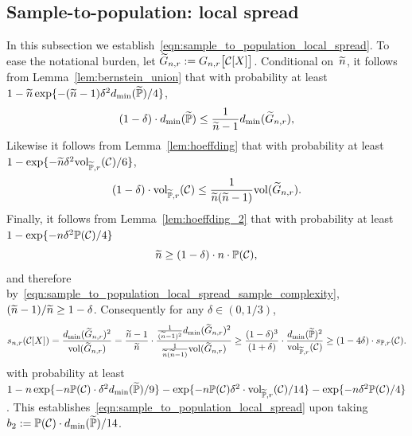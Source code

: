 \subsection{Sample-to-population: local spread}
\label{subsec:sample_to_population_local_spread}
In this subsection we establish~\eqref{eqn:sample_to_population_local_spread}. To ease the notational burden, let $\widetilde{G}_{n,r} := G_{n,r}\bigl[\mathcal{C}[X]\bigr]$. 
Conditional on~$\widetilde{n}$, it follows from Lemma~\ref{lem:bernstein_union} that with probability at least $1 - \widetilde{n}\exp\{-(\widetilde{n} - 1) \delta^2d_{\min}(\widetilde{\mathbb{P}})/4\}$,
\begin{equation}
\label{pf:sample_to_population_local_spread_2}
(1 - \delta) \cdot d_{\min}(\widetilde{\mathbb{P}}) \leq \frac{1}{\widetilde{n} - 1} d_{\min}(\widetilde{G}_{n,r}),
\end{equation}
Likewise it follows from Lemma~\ref{lem:hoeffding} that with probability at least $1 - \exp\{-\widetilde{n}\delta^2 \mathrm{vol}_{\widetilde{\mathbb{P}},r}(\mathcal{C})/6\}$,
\begin{equation*}
(1 - \delta) \cdot \mathrm{vol}_{\widetilde{\mathbb{P}},r}(\mathcal{C}) \leq \frac{1}{\widetilde{n}(\widetilde{n} - 1)} \mathrm{vol}(\widetilde{G}_{n,r}).
\end{equation*}
Finally, it follows from Lemma~\ref{lem:hoeffding_2} that with probability at least $1 - \exp\{-n\delta^2 \mathbb{P}(\mathcal{C})/4\}$
\begin{equation}
\label{pf:sample_to_population_local_spread_1}
\widetilde{n} \geq (1 - \delta) \cdot n \cdot \mathbb{P}(\mathcal{C}),
\end{equation}
and therefore by~\eqref{eqn:sample_to_population_local_spread_sample_complexity}, $(\widetilde{n} - 1)/\widetilde{n} \geq 1 - \delta$. Consequently for any $\delta \in (0,1/3)$,
\begin{equation*}
s_{n,r}(\mathcal{C}[X]) = \frac{d_{\min}(\widetilde{G}_{n,r})^2}{\mathrm{vol}(\widetilde{G}_{n,r})} = \frac{\widetilde{n} - 1}{\widetilde{n}} \cdot \frac{\frac{1}{(\widetilde{n} - 1)^2}d_{\min}(\widetilde{G}_{n,r})^2}{\frac{1}{\widetilde{n}(\widetilde{n} - 1)}\mathrm{vol}(\widetilde{G}_{n,r})} \geq \frac{(1 - \delta)^3}{(1 + \delta)} \cdot  \frac{d_{\min}(\widetilde{\mathbb{P}})^2}{\mathrm{vol}_{\widetilde{\mathbb{P}},r}(\mathcal{C})} \geq (1 - 4\delta) \cdot s_{\mathbb{P},r}(\mathcal{C}).
\end{equation*}
with probability at least $1 - n\exp\{-n\mathbb{P}(\mathcal{C}) \cdot \delta^2d_{\min}(\widetilde{\mathbb{P}})/9\} - \exp\{-n\mathbb{P}(\mathcal{C})\delta^2 \cdot \mathrm{vol}_{\widetilde{\mathbb{P}},r}(\mathcal{C})/14\} - \exp\{-n\delta^2 \mathbb{P}(\mathcal{C})/4\}$. This establishes~\eqref{eqn:sample_to_population_local_spread} upon taking $b_2 := \mathbb{P}(\mathcal{C}) \cdot d_{\min}(\widetilde{\mathbb{P}})/14$.



